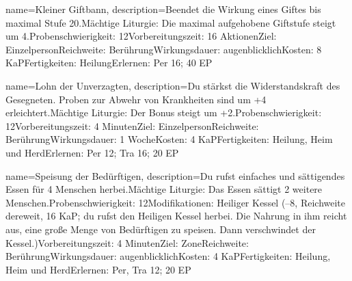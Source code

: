 {
    name={Kleiner Giftbann},
    description={Beendet die Wirkung eines Giftes bis maximal Stufe 20.\newline Mächtige Liturgie: Die maximal aufgehobene Giftstufe steigt um 4.\newline Probenschwierigkeit: 12\newline Vorbereitungszeit: 16 Aktionen\newline Ziel: Einzelperson\newline Reichweite: Berührung\newline Wirkungsdauer: augenblicklich\newline Kosten: 8 KaP\newline Fertigkeiten: Heilung\newline Erlernen: Per 16; 40 EP}
}


{
    name={Lohn der Unverzagten},
    description={Du stärkst die Widerstandskraft des Gesegneten. Proben zur Abwehr von Krankheiten sind um +4 erleichtert.\newline Mächtige Liturgie: Der Bonus steigt um +2.\newline Probenschwierigkeit: 12\newline Vorbereitungszeit: 4 Minuten\newline Ziel: Einzelperson\newline Reichweite: Berührung\newline Wirkungsdauer: 1 Woche\newline Kosten: 4 KaP\newline Fertigkeiten: Heilung, Heim und Herd\newline Erlernen: Per 12; Tra 16; 20 EP}
}


{
    name={Speisung der Bedürftigen},
    description={Du rufst einfaches und sättigendes Essen für 4 Menschen herbei.\newline Mächtige Liturgie: Das Essen sättigt 2 weitere Menschen.\newline Probenschwierigkeit: 12\newline Modifikationen: Heiliger Kessel (–8, Reichweite dereweit, 16 KaP; du rufst den Heiligen Kessel herbei. Die Nahrung in ihm reicht aus, eine große Menge von Bedürftigen zu speisen. Dann verschwindet der Kessel.)\newline Vorbereitungszeit: 4 Minuten\newline Ziel: Zone\newline Reichweite: Berührung\newline Wirkungsdauer: augenblicklich\newline Kosten: 4 KaP\newline Fertigkeiten: Heilung, Heim und Herd\newline Erlernen: Per, Tra 12; 20 EP}
}


